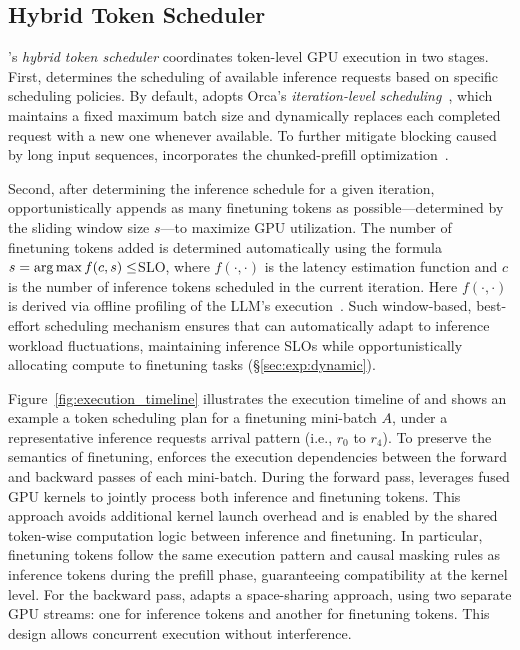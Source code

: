 \subsection{Hybrid Token Scheduler}
\label{subsec:scheduler}

\Sys's \textit{hybrid token scheduler} coordinates token-level GPU execution in two stages. 
%
First, \Sys determines the scheduling of available inference requests based on specific scheduling policies. By default, \sys adopts Orca's \textit{iteration-level scheduling}~\cite{yu2022orca}, which maintains a fixed maximum batch size and dynamically replaces each completed request with a new one whenever available.
%
To further mitigate blocking caused by long input sequences, \sys incorporates the chunked-prefill optimization~\cite{agrawal2024taming}.

Second, after determining the inference schedule for a given iteration, \sys opportunistically appends as many finetuning tokens as possible---determined by the sliding window size $s$---to maximize GPU utilization. The number of finetuning tokens added is determined automatically using the formula $s=\argmax f(c, s)\leq$SLO, where $f(\cdot, \cdot)$ is the latency estimation function and $c$ is the number of inference tokens scheduled in the current iteration. Here $f(\cdot, \cdot)$ is derived via offline profiling of the LLM's execution~\cite{narayanan2023cheaply}.
%
Such window-based, best-effort scheduling mechanism ensures that \sys can automatically adapt to inference workload fluctuations, maintaining inference SLOs while opportunistically allocating compute to finetuning tasks (\S\ref{sec:exp:dynamic}).

Figure~\ref{fig:execution_timeline} illustrates the execution timeline of \Sys and shows an example a token scheduling plan for a finetuning mini-batch $A$, under a representative inference requests arrival pattern (i.e., $r_0$ to $r_4$).
To preserve the semantics of finetuning, \sys enforces the execution dependencies between the forward and backward passes of each mini-batch.
During the forward pass, \sys leverages fused GPU kernels to jointly process both inference and finetuning tokens. This approach avoids additional kernel launch overhead and is enabled by the shared token-wise computation logic between inference and finetuning. In particular, finetuning tokens follow the same execution pattern and causal masking rules as inference tokens during the prefill phase, guaranteeing compatibility at the kernel level.
For the backward pass, \sys adapts a space-sharing approach, using two separate GPU streams: one for inference tokens and another for finetuning tokens. This design allows concurrent execution without interference.
